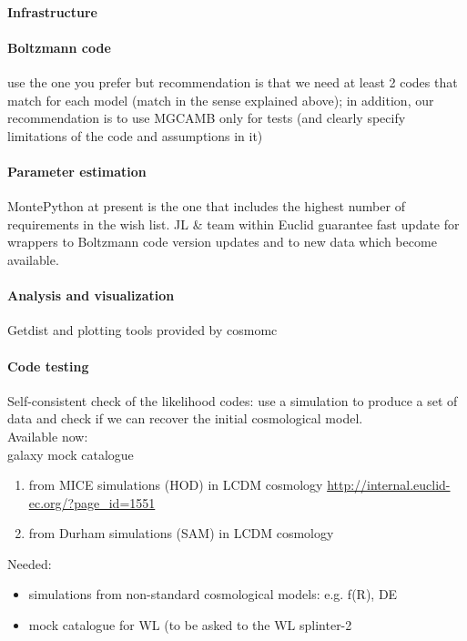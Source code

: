 \paragraph{Infrastructure}

\paragraph{Boltzmann code}

use the one you prefer but recommendation is that we need at least 2 codes that match for each model (match in the sense explained above); 
in addition, our recommendation is to use MGCAMB only for tests (and clearly specify limitations of the code and assumptions in it)


\paragraph{Parameter estimation}
MontePython at present is the one that includes the highest number of requirements in the wish list. JL \& team within Euclid guarantee fast 
update for wrappers to Boltzmann code version updates and to new data which become available. 

\paragraph{Analysis and visualization}
Getdist and plotting tools provided by cosmomc

\paragraph{Code testing}
Self-consistent check of the likelihood codes:  use a simulation to produce a set of data and check if we can recover the initial cosmological model.\\
Available now: \\
galaxy mock catalogue
\begin{enumerate}
 \item from MICE simulations (HOD) in LCDM cosmology  \url{http://internal.euclid-ec.org/?page_id=1551}
 \item from Durham simulations (SAM) in LCDM cosmology 
\end{enumerate}
Needed:
\begin{itemize}
 \item simulations from non-standard cosmological models: e.g. f(R), DE 
 \item mock catalogue for WL (to be asked to the WL splinter-2
\end{itemize}


